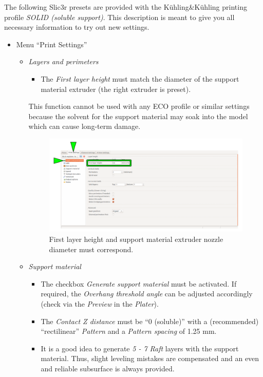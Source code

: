 The following Slic3r presets are provided with 
the Kühling\&Kühling printing profile \emph{SOLID (soluble support)}. This description is meant to give you all necessary information to try out new settings. 

\begin{itemize}
  \item Menu “Print Settings” 

  \begin{itemize}
    \item \emph{Layers and perimeters}

      \begin{itemize}
        \item The \emph{First layer height} must match the diameter of 
              the support material extruder (the right extruder is preset). 
      \end{itemize}

      \begin{info}
        This function cannot be used with any ECO profile or similar settings because the solvent for the support material may soak into the model which can cause long-term damage.
      \end{info}

      \begin{figure}[H]
        \centering
        \includegraphics[width=.7\linewidth]{./img/slic3r_bicolor_new2.png}
        \caption{First layer height and support material extruder nozzle diameter
                 must correspond.}
      \end{figure}

    \item \emph{Support material} 

      \begin{itemize}    
        \item The checkbox \emph{Generate support material} must be activated. If required, 
              the \emph{Overhang threshold angle} can be adjusted accordingly 
              (check via the \emph{Preview} in the \emph{Plater}).
        \item The \emph{Contact Z distance} must be “0 (soluble)” with a (recommended) 
            “rectilinear” \emph{Pattern} and a \emph{Pattern spacing} of 1.25 mm.
        \item It is a good idea to generate \emph{5 - 7 Raft} layers with 
              the support material. 
              Thus, slight leveling mistakes are compensated and an even and reliable subsurface is always provided.
      \end{itemize}


\end{itemize}
\end{itemize}
